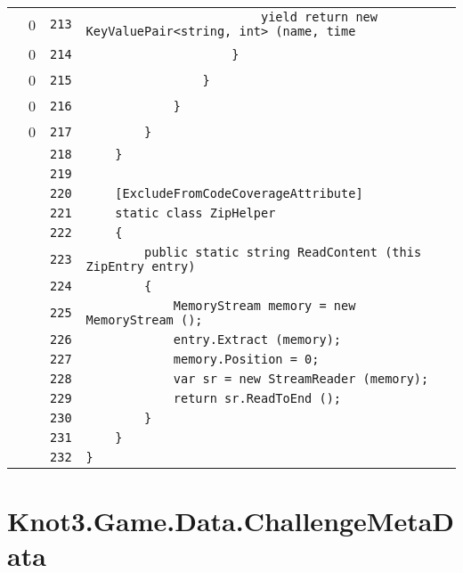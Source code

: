 \documentclass[a4paper,10pt]{article}
\begin{document}
\begin{longtable}[l]{lrrl}
\cellcolor{red} & 0 & \verb~213~ & \verb~                        yield return new KeyValuePair<string, int> (name, time~\\
\cellcolor{red} & 0 & \verb~214~ & \verb~                    }~\\
\cellcolor{red} & 0 & \verb~215~ & \verb~                }~\\
\cellcolor{red} & 0 & \verb~216~ & \verb~            }~\\
\cellcolor{red} & 0 & \verb~217~ & \verb~        }~\\
\cellcolor{gray} &  & \verb~218~ & \verb~    }~\\
\cellcolor{gray} &  & \verb~219~ & \verb~~\\
\cellcolor{gray} &  & \verb~220~ & \verb~    [ExcludeFromCodeCoverageAttribute]~\\
\cellcolor{gray} &  & \verb~221~ & \verb~    static class ZipHelper~\\
\cellcolor{gray} &  & \verb~222~ & \verb~    {~\\
\cellcolor{gray} &  & \verb~223~ & \verb~        public static string ReadContent (this ZipEntry entry)~\\
\cellcolor{gray} &  & \verb~224~ & \verb~        {~\\
\cellcolor{gray} &  & \verb~225~ & \verb~            MemoryStream memory = new MemoryStream ();~\\
\cellcolor{gray} &  & \verb~226~ & \verb~            entry.Extract (memory);~\\
\cellcolor{gray} &  & \verb~227~ & \verb~            memory.Position = 0;~\\
\cellcolor{gray} &  & \verb~228~ & \verb~            var sr = new StreamReader (memory);~\\
\cellcolor{gray} &  & \verb~229~ & \verb~            return sr.ReadToEnd ();~\\
\cellcolor{gray} &  & \verb~230~ & \verb~        }~\\
\cellcolor{gray} &  & \verb~231~ & \verb~    }~\\
\cellcolor{gray} &  & \verb~232~ & \verb~}~\\
\end{longtable}
\newpage
\section{Knot3.Game.Data.ChallengeMetaData}
\end{document}
